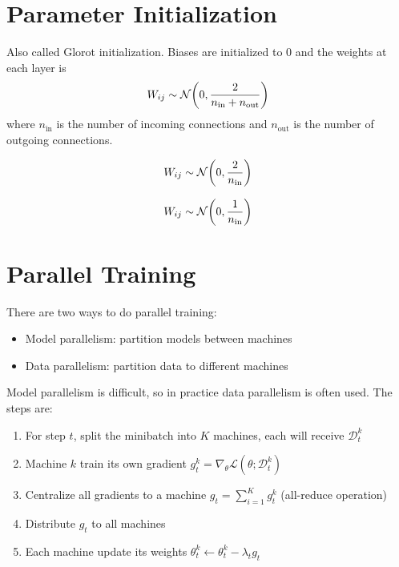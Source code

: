 \section{Parameter Initialization}

\begin{definition}
    Also called Glorot initialization. Biases are initialized to $0$ and the weights at each layer is
    \begin{equation}
        W_{ij} \sim \mathcal{N}\mleft(0, \frac{2}{n_{\text{in}} + n_{\text{out}}} \mright)
    \end{equation}
    where $n_{\text{in}}$ is the number of incoming connections and $n_{\text{out}}$ is the number of outgoing connections.
\end{definition}

\begin{definition}[He Initialization]
    \begin{equation}
        W_{ij} \sim \mathcal{N}\mleft(0, \frac{2}{n_{\text{in}}} \mright)
    \end{equation}
\end{definition}

\begin{definition}
    \begin{equation}
        W_{ij} \sim \mathcal{N}\mleft(0, \frac{1}{n_{\text{in}}} \mright)
    \end{equation}
\end{definition}



\section{Parallel Training}

There are two ways to do parallel training:
\begin{itemize}
    \item Model parallelism: partition models between machines
    \item Data parallelism: partition data to different machines
\end{itemize}

Model parallelism is difficult, so in practice data parallelism is often used. The steps are:
\begin{enumerate}
    \item For step $t$, split the minibatch into $K$ machines, each will receive $\mathcal{D}_t^k$
    \item Machine $k$ train its own gradient $g_t^k = \nabla_\theta \mathcal{L}(\theta;\mathcal{D}_t^k)$
    \item Centralize all gradients to a machine $g_t = \sum_{i=1}^K g_t^k$ (all-reduce operation)
    \item Distribute $g_t$ to all machines
    \item Each machine update its weights $\theta_t^k \leftarrow \theta_t^k - \lambda_t g_t$
\end{enumerate}

